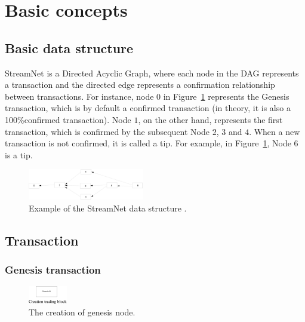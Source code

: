 \section{Basic concepts}
\subsection{Basic data structure}
StreamNet is a Directed Acyclic Graph, where each node in the DAG represents a transaction and the directed edge represents a confirmation relationship between transactions.
For instance, node $0$ in Figure~\ref{simple_sn} represents the Genesis transaction, which is by default a confirmed transaction (in theory, it is also a 100\%confirmed transaction).
Node $1$, on the other hand, represents the first transaction, which is confirmed by the subsequent Node $2$, $3$ and $4$. 
When a new transaction is not confirmed, it is called a tip.
For example, in Figure~\ref{simple_sn}, Node $6$ is a tip.

\begin{figure}[!ht]
\begin{center}
\includegraphics[width=0.45\textwidth]{figures/simple_sn.eps}
    \caption{
        Example of the StreamNet data structure \cite{gal_2018}.
     }
\label{simple_sn}
\end{center}
\end{figure}



\subsection{Transaction}
\subsubsection{Genesis transaction}

\begin{figure}[!ht]
\begin{center}
\includegraphics[width=0.15\textwidth]{figures/genesis.eps}
    \caption{
        The creation of genesis node.
     }
\label{genesis}
\end{center}
\end{figure}

